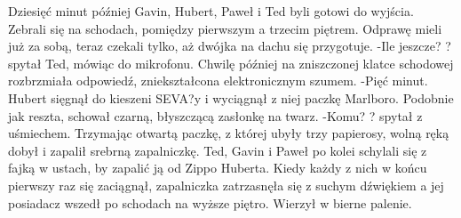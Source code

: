 \documentclass[../MAIN.tex]{subfiles}
\begin{document}
Dziesięć minut później Gavin, Hubert, Paweł i Ted byli gotowi do wyjścia. Zebrali się na schodach, pomiędzy pierwszym a trzecim piętrem. Odprawę mieli już za sobą, teraz czekali tylko, aż dwójka na dachu się przygotuje.
-Ile jeszcze? ? spytał Ted, mówiąc do mikrofonu. Chwilę później na zniszczonej klatce schodowej rozbrzmiała odpowiedź, zniekształcona elektronicznym szumem.
-Pięć minut.
Hubert sięgnął do kieszeni SEVA?y i wyciągnął z niej paczkę Marlboro. Podobnie jak reszta, schował czarną, błyszczącą zasłonkę na twarz.
-Komu? ? spytał z uśmiechem. Trzymając otwartą paczkę, z której ubyły trzy papierosy, wolną ręką dobył i zapalił srebrną zapalniczkę. Ted, Gavin i Paweł po kolei schylali się z fajką w ustach, by zapalić ją od Zippo Huberta. Kiedy każdy z nich w końcu pierwszy raz się zaciągnął, zapalniczka zatrzasnęła się z suchym dźwiękiem a jej posiadacz wszedł po schodach na wyższe piętro. Wierzył w bierne palenie.
\end{document}
